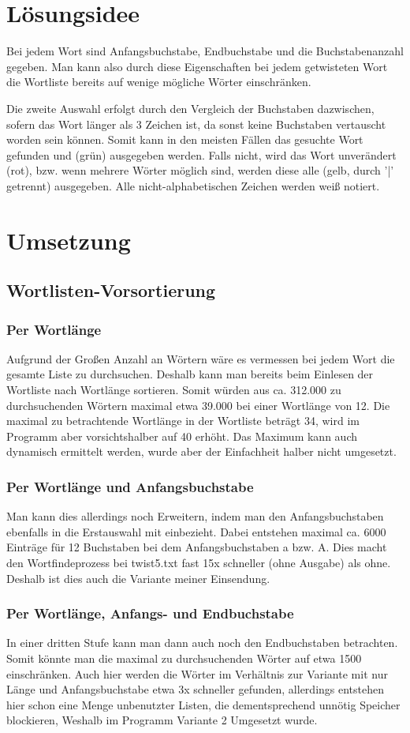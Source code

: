 \documentclass[a4paper,10pt,ngerman]{scrartcl}
\title{\Aufgabe}
\author{\Name\\Team-ID: \TeamId}
\date{\today}
\newcommand{\newsection}{\vspace{3\baselineskip}\section}
\newcommand{\newsubsection}{\vspace{2\baselineskip}\subsection}
\newcommand{\newsubsubsection}{\vspace{1\baselineskip}\subsubsection}
\begin{document}
\maketitle
\vspace{7\baselineskip}
\tableofcontents
\pagebreak



\newsection{Lösungsidee}
\vspace{1\baselineskip}
Bei jedem Wort sind Anfangsbuchstabe, Endbuchstabe und die Buchstabenanzahl gegeben. Man kann also durch diese Eigenschaften bei jedem getwisteten Wort die Wortliste bereits auf wenige mögliche Wörter einschränken.

Die zweite Auswahl erfolgt durch den Vergleich der Buchstaben dazwischen, sofern das Wort länger als 3 Zeichen ist, da sonst keine Buchstaben vertauscht worden sein können. Somit kann in den meisten Fällen das gesuchte Wort gefunden und (grün) ausgegeben werden. Falls nicht, wird das Wort unverändert (rot), bzw. wenn mehrere Wörter möglich sind, werden diese alle (gelb, durch '|' getrennt) ausgegeben. Alle nicht-alphabetischen Zeichen werden weiß notiert.



\pagebreak
\newsection{Umsetzung}

\newsubsection{Wortlisten-Vorsortierung}

\newsubsubsection{Per Wortlänge} %
Aufgrund der Großen Anzahl an Wörtern wäre es vermessen bei jedem Wort die gesamte Liste zu durchsuchen. Deshalb kann man bereits beim Einlesen der Wortliste nach Wortlänge sortieren. Somit würden aus ca. 312.000 zu durchsuchenden Wörtern maximal etwa 39.000 bei einer Wortlänge von 12.
Die maximal zu betrachtende Wortlänge in der Wortliste beträgt 34, wird im Programm aber vorsichtshalber auf 40 erhöht. Das Maximum kann auch dynamisch ermittelt werden, wurde aber der Einfachheit halber nicht umgesetzt.

\newsubsubsection{Per Wortlänge und Anfangsbuchstabe} %
Man kann dies allerdings noch Erweitern, indem man den Anfangsbuchstaben ebenfalls in die Erstauswahl mit einbezieht. Dabei entstehen maximal ca. 6000 Einträge für 12 Buchstaben bei dem Anfangsbuchstaben a bzw. A. Dies macht den Wortfindeprozess bei twist5.txt fast 15x schneller (ohne Ausgabe) als ohne. Deshalb ist dies auch die Variante meiner Einsendung.

\newsubsubsection{Per Wortlänge, Anfangs- und Endbuchstabe} %
In einer dritten Stufe kann man dann auch noch den Endbuchstaben betrachten. Somit könnte man die maximal zu durchsuchenden Wörter auf etwa 1500 einschränken. Auch hier werden die Wörter im Verhältnis zur Variante mit nur Länge und Anfangsbuchstabe etwa 3x schneller gefunden, allerdings entstehen hier schon eine Menge unbenutzter Listen, die dementsprechend unnötig Speicher blockieren, Weshalb im Programm Variante 2 Umgesetzt wurde.
\end{document}
